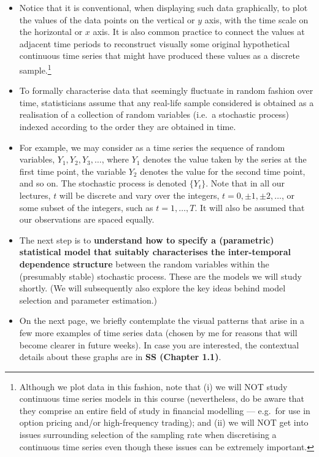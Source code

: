 \documentclass[
  letterpaper,
  DIV=11,
  numbers=noendperiod]{scrartcl}
\begin{document}
\begin{itemize}
\item
  Notice that it is conventional, when displaying such data graphically,
  to plot the values of the data points on the vertical or \(y\) axis,
  with the time scale on the horizontal or \(x\) axis. It is also common
  practice to connect the values at adjacent time periods to reconstruct
  visually some original hypothetical continuous time series that might
  have produced these values as a discrete sample.\footnote{Although we
    plot data in this fashion, note that (i) we will NOT study
    continuous time series models in this course (nevertheless, do be
    aware that they comprise an entire field of study in financial
    modelling --- e.g.~for use in option pricing and/or high-frequency
    trading); and (ii) we will NOT get into issues surrounding selection
    of the sampling rate when discretising a continuous time series even
    though these issues can be extremely important.}
\item
  To formally characterise data that seemingly fluctuate in random
  fashion over time, statisticians assume that any real-life sample
  considered is obtained as a realisation of a collection of random
  variables (i.e.~a stochastic process) indexed according to the order
  they are obtained in time.
\item
  For example, we may consider as a time series the sequence of random
  variables, \(Y_1, Y_2, Y_3, \ldots\), where \(Y_1\) denotes the value
  taken by the series at the first time point, the variable \(Y_2\)
  denotes the value for the second time point, and so on. The stochastic
  process is denoted \(\{Y_t\}\). Note that in all our lectures, \(t\)
  will be discrete and vary over the integers,
  \(t = 0, \pm 1, \pm 2, \ldots\), or some subset of the integers, such
  as \(t = 1, \ldots, T\). It will also be assumed that our observations
  are spaced equally.
\item
  The next step is to \textbf{understand how to specify a (parametric)
  statistical model that suitably characterises the inter-temporal
  dependence structure} between the random variables within the
  (presumably stable) stochastic process. These are the models we will
  study shortly. (We will subsequently also explore the key ideas behind
  model selection and parameter estimation.)
\item
  On the next page, we briefly contemplate the visual patterns that
  arise in a few more examples of time series data (chosen by me for
  reasons that will become clearer in future weeks). In case you are
  interested, the contextual details about these graphs are in
  \textbf{SS (Chapter 1.1)}.
\end{itemize}
\end{document}
